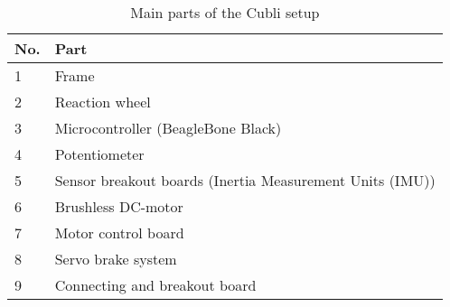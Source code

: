 \begin{table}[H]
	\begin{tabular}{|l|p{6.7cm}|}
		\hline %
		\textbf{No.} &\textbf{Part} 			\\
		\hline %
		1            & Frame           			\\
		\hline %
		2            & Reaction wheel      		\\
		\hline %
		3            & Microcontroller (BeagleBone Black)  \\
		\hline %
		4            & Potentiometer			\\
		\hline %
		5            & Sensor breakout boards (Inertia Measurement Units (IMU))       			\\
		\hline %
		6            & Brushless DC-motor   	\\
		\hline %
		7            & Motor control board     	\\
		\hline %
		8            & Servo brake system 		    	\\
		\hline %
		9            & Connecting and breakout board		    	\\
		\hline %
	\end{tabular}
	\caption{Main parts of the Cubli setup}
\label{TableAAUCubliComponent}
\end{table}




